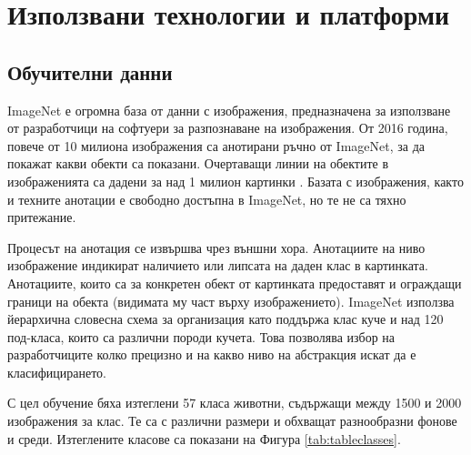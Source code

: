 \chapter{Използвани технологии и платформи}

\label{Chapter3}


\section{Обучителни данни}

ImageNet е огромна база от данни с изображения, предназначена за използване от разработчици на софтуери за разпознаване на изображения. От 2016 година, повече от 10 милиона изображения са анотирани ръчно от ImageNet, за да покажат какви обекти са показани. Очертаващи линии на обектите в изображенията са дадени за над 1 милион картинки \cite{ImageNet}. Базата с изображения, както и техните анотации е свободно достъпна в ImageNet, но те не са тяхно притежание.

Процесът на анотация се извършва чрез външни хора. Анотациите на ниво изображение индикират наличието или липсата на даден клас в картинката. Анотациите, които са за конкретен обект от картинката предоставят и ограждащи граници на обекта (видимата му част върху изображението). ImageNet използва йерархична словесна схема за организация като поддържа клас куче и над 120 под-класа, които са различни породи кучета. Това позволява избор на разработчиците колко прецизно и на какво ниво на абстракция искат да е класифицирането.

С цел обучение бяха изтеглени 57 класа животни, съдържащи между 1500 и 2000 изображения за клас. Те са с различни размери и обхващат разнообразни фонове и среди. Изтеглените класове са показани на Фигура \ref{tab:tableclasses}.

